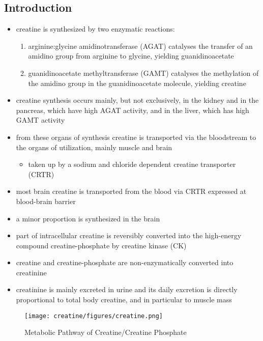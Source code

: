 \documentclass[12pt]{scrartcl}
\begin{document}
\subsection{Introduction}
\label{sec:org43a471d}
\begin{itemize}
\item creatine is synthesized by two enzymatic reactions:
\begin{enumerate}
\item arginine:glycine amidinotransferase (AGAT) catalyses the
transfer of an amidino group from arginine to glycine, yielding
guanidinoacetate
\item guanidinoacetate methyltransferase (GAMT) catalyses the
methylation of the amidino group in the guanidinoacetate
molecule, yielding creatine
\end{enumerate}

\item creatine synthesis occurs mainly, but not exclusively, in the kidney
and in the pancreas, which have high AGAT activity, and in the
liver, which has high GAMT activity

\item from these organs of synthesis creatine is transported via the
bloodstream to the organs of utilization, mainly muscle and brain
\begin{itemize}
\item taken up by a sodium and chloride dependent creatine transporter
(CRTR)
\end{itemize}

\item most brain creatine is transported from the blood via CRTR expressed
at blood-brain barrier
\item a minor proportion is synthesized in the brain

\item part of intracellular creatine is reversibly converted into the
high-energy compound creatine-phosphate by creatine kinase (CK)

\item creatine and creatine-phosphate are non-enzymatically converted into
creatinine

\item creatinine is mainly excreted in urine and its daily excretion is
directly proportional to total body creatine, and in particular to
muscle mass
\end{itemize}

\begin{figure}[htbp]
\centering
\texttt{[image: creatine/figures/creatine.png]}
\caption{\label{fig:org0242b9f}Metabolic Pathway of Creatine/Creatine Phosphate}
\end{figure}
\end{document}
